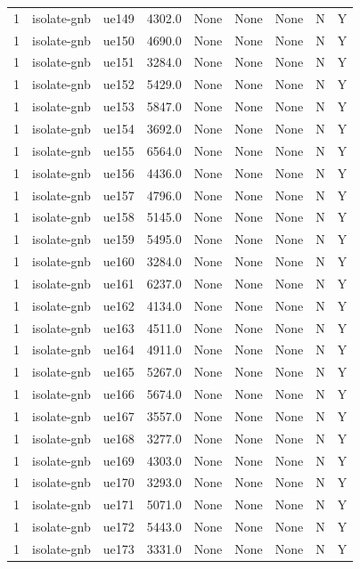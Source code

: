\begin{table}[ht]
\begin{tabular}{|c|c|c|c|c|c|c|c|c|}
1 & isolate-gnb & ue149 & 4302.0 & None & None & None & N & Y \\
1 & isolate-gnb & ue150 & 4690.0 & None & None & None & N & Y \\
1 & isolate-gnb & ue151 & 3284.0 & None & None & None & N & Y \\
1 & isolate-gnb & ue152 & 5429.0 & None & None & None & N & Y \\
1 & isolate-gnb & ue153 & 5847.0 & None & None & None & N & Y \\
1 & isolate-gnb & ue154 & 3692.0 & None & None & None & N & Y \\
1 & isolate-gnb & ue155 & 6564.0 & None & None & None & N & Y \\
1 & isolate-gnb & ue156 & 4436.0 & None & None & None & N & Y \\
1 & isolate-gnb & ue157 & 4796.0 & None & None & None & N & Y \\
1 & isolate-gnb & ue158 & 5145.0 & None & None & None & N & Y \\
1 & isolate-gnb & ue159 & 5495.0 & None & None & None & N & Y \\
1 & isolate-gnb & ue160 & 3284.0 & None & None & None & N & Y \\
1 & isolate-gnb & ue161 & 6237.0 & None & None & None & N & Y \\
1 & isolate-gnb & ue162 & 4134.0 & None & None & None & N & Y \\
1 & isolate-gnb & ue163 & 4511.0 & None & None & None & N & Y \\
1 & isolate-gnb & ue164 & 4911.0 & None & None & None & N & Y \\
1 & isolate-gnb & ue165 & 5267.0 & None & None & None & N & Y \\
1 & isolate-gnb & ue166 & 5674.0 & None & None & None & N & Y \\
1 & isolate-gnb & ue167 & 3557.0 & None & None & None & N & Y \\
1 & isolate-gnb & ue168 & 3277.0 & None & None & None & N & Y \\
1 & isolate-gnb & ue169 & 4303.0 & None & None & None & N & Y \\
1 & isolate-gnb & ue170 & 3293.0 & None & None & None & N & Y \\
1 & isolate-gnb & ue171 & 5071.0 & None & None & None & N & Y \\
1 & isolate-gnb & ue172 & 5443.0 & None & None & None & N & Y \\
1 & isolate-gnb & ue173 & 3331.0 & None & None & None & N & Y \\

\end{tabular}
\end{table}
